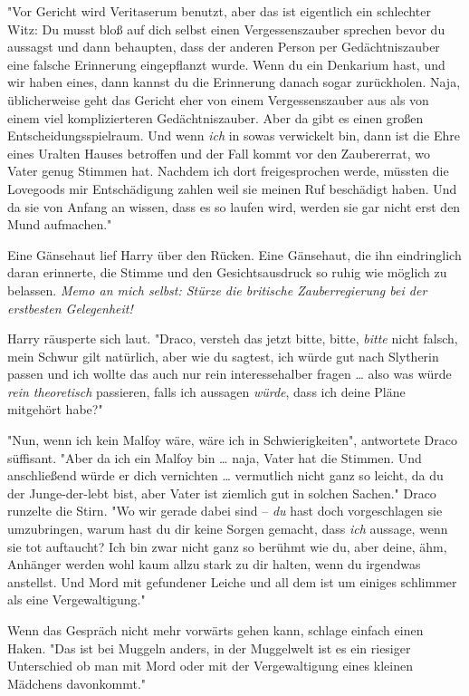 {"Vor Gericht wird Veritaserum benutzt, aber das ist eigentlich ein schlechter Witz: Du musst bloß auf dich selbst einen Vergessenszauber sprechen bevor du aussagst und dann behaupten, dass der anderen Person per Gedächtniszauber eine falsche Erinnerung eingepflanzt wurde. Wenn du ein Denkarium hast, und wir haben eines, dann kannst du die Erinnerung danach sogar zurückholen. Naja, üblicherweise geht das Gericht eher von einem Vergessenszauber aus als von einem viel komplizierteren Gedächtniszauber. Aber da gibt es einen großen Entscheidungsspielraum. Und wenn \emph{ich} in sowas verwickelt bin, dann ist die Ehre eines Uralten Hauses betroffen und der Fall kommt vor den Zaubererrat, wo Vater genug Stimmen hat. Nachdem ich dort freigesprochen werde, müssten die Lovegoods mir Entschädigung zahlen weil sie meinen Ruf beschädigt haben. Und da sie von Anfang an wissen, dass es so laufen wird, werden sie gar nicht erst den Mund aufmachen."

Eine Gänsehaut lief Harry über den Rücken. Eine Gänsehaut, die ihn eindringlich daran erinnerte, die Stimme und den Gesichtsausdruck so ruhig wie möglich zu belassen. \emph{Memo an mich selbst: Stürze die britische Zauberregierung bei der erstbesten Gelegenheit!}

Harry räusperte sich laut. "Draco, versteh das jetzt bitte, bitte, \emph{bitte} nicht falsch, mein Schwur gilt natürlich, aber wie du sagtest, ich würde gut nach Slytherin passen und ich wollte das auch nur rein interessehalber fragen … also was würde \emph{rein theoretisch} passieren, falls ich aussagen \emph{würde}, dass ich deine Pläne mitgehört habe?"

"Nun, wenn ich kein Malfoy wäre, wäre ich in Schwierigkeiten", antwortete Draco süffisant. "Aber da ich ein Malfoy bin … naja, Vater hat die Stimmen. Und anschließend würde er dich vernichten … vermutlich nicht ganz so leicht, da du der Junge-der-lebt bist, aber Vater ist ziemlich gut in solchen Sachen." Draco runzelte die Stirn. "Wo wir gerade dabei sind -- \emph{du} hast doch vorgeschlagen sie umzubringen, warum hast du dir keine Sorgen gemacht, dass \emph{ich} aussage, wenn sie tot auftaucht? Ich bin zwar nicht ganz so berühmt wie du, aber deine, ähm, Anhänger werden wohl kaum allzu stark zu dir halten, wenn du irgendwas anstellst. Und Mord mit gefundener Leiche und all dem ist um einiges schlimmer als eine Vergewaltigung."

Wenn das Gespräch nicht mehr vorwärts gehen kann, schlage einfach einen Haken. "Das ist bei Muggeln anders, in der Muggelwelt ist es ein riesiger Unterschied ob man mit Mord oder mit der Vergewaltigung eines kleinen Mädchens davonkommt."

}

